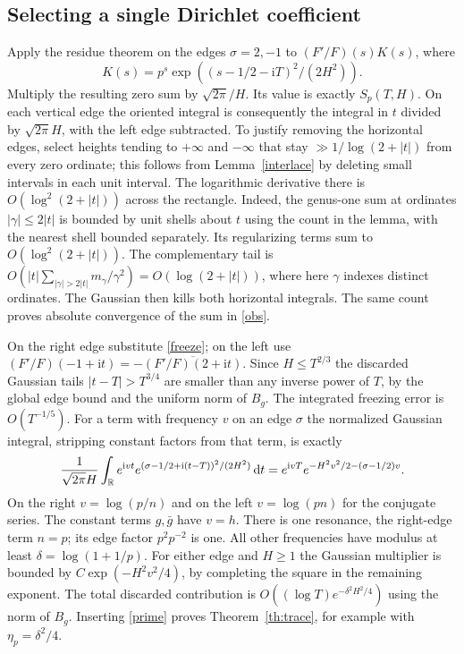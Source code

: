 \documentclass[11pt,letterpaper]{article}
\newcommand{\dd}{\mathrm d}\newcommand{\ii}{\mathrm i}
\begin{document}
\subsection{Selecting a single Dirichlet coefficient}
Apply the residue theorem on the edges $\sigma=2,-1$ to $(F'/F)(s)K(s)$,
where
\[
 K(s)=p^s\exp((s-1/2-\ii T)^2/(2H^2)).
\]
Multiply the resulting zero sum by $\sqrt{2\pi}/H$. Its value is exactly
$S_p(T,H)$. On each vertical edge the oriented integral is consequently
the integral in $t$ divided by $\sqrt{2\pi}H$, with the left edge
subtracted. To justify removing the horizontal edges, select heights
tending to $+\infty$ and $-\infty$ that stay $\gg1/\log(2+|t|)$ from
every zero ordinate; this follows from Lemma~\ref{interlace} by deleting
small intervals in each unit interval. The logarithmic derivative there
is $O(\log^2(2+|t|))$ across the rectangle. Indeed, the genus-one sum
at ordinates $|\gamma|\le 2|t|$ is bounded by unit shells about $t$
using the count in the lemma, with the nearest shell bounded separately.
Its regularizing terms sum to $O(\log^2(2+|t|))$. The complementary tail
is $O(|t|\sum_{|\gamma|>2|t|}m_\gamma/\gamma^2)=O(\log(2+|t|))$,
where here $\gamma$ indexes distinct ordinates. The Gaussian then kills
both horizontal integrals. The same count proves absolute convergence
of the sum in \eqref{obs}.

On the right edge substitute \eqref{freeze}; on the left use
$(F'/F)(-1+\ii t)=-\overline{(F'/F)(2+\ii t)}$. Since
$H\le T^{2/3}$ the discarded Gaussian tails $|t-T|>T^{3/4}$ are
smaller than any inverse power of $T$, by the global edge bound and
the uniform norm of $B_g$. The integrated freezing error is $O(T^{-1/5})$.
For a term with frequency $v$ on an edge $\sigma$ the normalized
Gaussian integral, stripping constant factors from that term, is exactly
\[
 \frac1{\sqrt{2\pi}H}\int_{\R}e^{\ii vt}
   e^{(\sigma-1/2+\ii(t-T))^2/(2H^2)}\,\dd t
   =e^{\ii vT}e^{-H^2v^2/2-(\sigma-1/2)v}.
\]
On the right $v=\log(p/n)$ and on the left $v=\log(pn)$ for the
conjugate series. The constant terms $g,\bar g$ have $v=h$. There is
one resonance, the right-edge term $n=p$; its edge factor $p^2p^{-2}$ is
one. All other frequencies have modulus at least $\delta=\log(1+1/p)$.
For either edge and $H\ge1$ the Gaussian multiplier is bounded by
$C\exp(-H^2 v^2/4)$, by completing the square in the remaining exponent.
The total discarded contribution is $O((\log T)e^{-\delta^2H^2/4})$
using the norm of $B_g$. Inserting \eqref{prime} proves
Theorem~\ref{th:trace}, for example with $\eta_p=\delta^2/4$.
\end{document}
